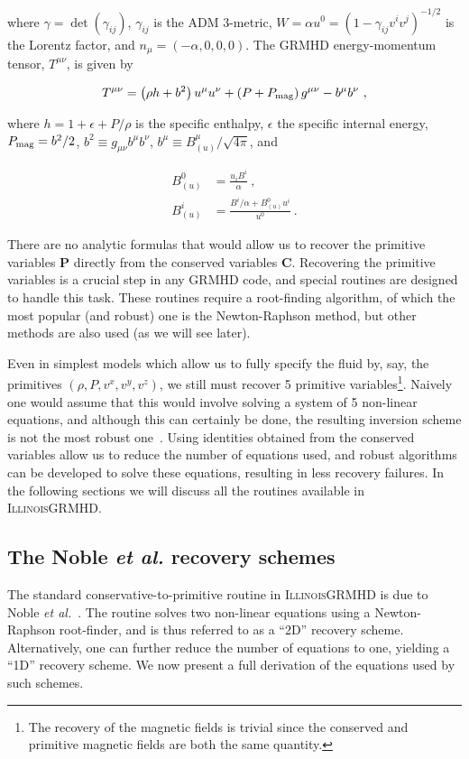 \documentclass{article}
\newcommand{\igm}{\textsc{IllinoisGRMHD}\xspace}
\newcommand{\primv}{\bm{P}}
\newcommand{\consv}{\bm{C}}
\newcommand{\etal}{\textit{et al.}\xspace}
\newcommand{\eq}[1]{
\begin{equation}
    #1
\end{equation}
}
\newcommand{\al}[1] {
\begin{align}
    #1
\end{align}
}
\begin{document}
\noindent where $\gamma=\det\left(\gamma_{ij}\right)$, $\gamma_{ij}$ is the ADM 3-metric, $W=\alpha u^{0} = \left(1-\gamma_{ij}v^{i}v^{j}\right)^{-1/2}$ is the Lorentz factor, and $n_{\mu}=\left(-\alpha,0,0,0\right)$. The GRMHD energy-momentum tensor, $T^{\mu\nu}$, is given by

\eq{
T^{\mu\nu} = \left(\rho h + b^{2}\right)u^{\mu}u^{\nu} + \left(P + P_{\rm mag}\right) g^{\mu\nu} - b^{\mu}b^{\nu}\ ,
}

\noindent where $h = 1 + \epsilon + P/\rho$ is the specific enthalpy, $\epsilon$ the specific internal energy, $P_{\rm mag} = b^{2}/2$, $b^{2} \equiv g_{\mu\nu}b^{\mu}b^{\nu}$, $b^{\mu} \equiv B^{\mu}_{(u)}/\sqrt{4\pi}$, and

\al{
B^{0}_{(u)} &= \frac{u_{i}B^{i}}{\alpha}\ ,\label{eq:B0u}\\
B^{i}_{(u)} &= \frac{B^{i}/\alpha + B^{0}_{(u)}u^{i}}{u^{0}}\label{eq:Biu}\ .
}

There are no analytic formulas that would allow us to recover the primitive variables $\primv$ directly from the conserved variables $\consv$. Recovering the primitive variables is a crucial step in any GRMHD code, and special routines are designed to handle this task. These routines require a root-finding algorithm, of which the most popular (and robust) one is the Newton-Raphson method, but other methods are also used (as we will see later).

Even in simplest models which allow us to fully specify the fluid by, say, the primitives $\left(\rho,P,v^{x},v^{y},v^{z}\right)$, we still must  recover 5 primitive variables\footnote{The recovery of the magnetic fields is trivial since the conserved and primitive magnetic fields are both the same quantity.}. Naively one would assume that this would involve solving a system of 5 non-linear equations, and although this can certainly be done, the resulting inversion scheme is not the most robust one~\cite{noble2006primitive}. Using identities obtained from the conserved variables allow us to reduce the number of equations used, and robust algorithms can be developed to solve these equations, resulting in less recovery failures. In the following sections we will discuss all the routines available in \igm.

\subsection{The Noble \etal recovery schemes}

The standard conservative-to-primitive routine in \igm is due to Noble \etal~\cite{noble2006primitive}. The routine solves two non-linear equations using a Newton-Raphson root-finder, and is thus referred to as a ``2D'' recovery scheme. Alternatively, one can further reduce the number of equations to one, yielding a ``1D'' recovery scheme. We now present a full derivation of the equations used by such schemes.
\end{document}
